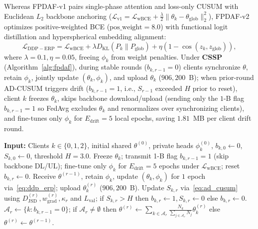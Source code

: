 \documentclass{llncs}
\begin{document}
Whereas FPDAF-v1 pairs single-phase attention and loss-only CUSUM with Euclidean $L_2$ backbone anchoring ($\mathcal{L}_{\mathrm{v1}} = \mathcal{L}_{\mathrm{wBCE}} + \frac{\lambda}{2}\|\theta_k-\theta_{\mathrm{glob}}\|_2^2$), FPDAF-v2 optimizes positive-weighted BCE ($\mathrm{pos\_weight}=8.0$) with functional logit distillation and hyperspherical embedding alignment:
\begin{equation}\label{eq:ddp_erp}
\mathcal{L}_{\mathrm{DDP-ERP}}
=\mathcal{L}_{\mathrm{wBCE}}
+\lambda D_{\mathrm{KL}}(P_k\|P_{\mathrm{glob}})
+\eta\left(1-\cos(z_k,z_{\mathrm{glob}})\right),
\end{equation}
where $\lambda=0.1, \eta=0.05$, freeing $\phi_k$ from weight penalties. Under \textbf{CSSP} (Algorithm~\ref{alg:fpdaf}), during stable rounds ($b_{k,r-1}=0$) clients synchronize $\theta$, retain $\phi_k$, jointly update $(\theta_k,\phi_k)$, and upload $\theta_k$ ($906{,}200$~B); when prior-round AD-CUSUM triggers drift ($b_{k,r-1}=1$, i.e., $S_{r-1}$ exceeded $H$ prior to reset), client $k$ freezes $\theta_k$, skips backbone download/upload (sending only the $1$-B flag $b_{k,r-1}=1$ so FedAvg excludes $\theta_k$ and renormalizes over synchronizing clients), and fine-tunes only $\phi_k$ for $E_{\mathrm{drift}}=5$ local epochs, saving $1.81$~MB per client drift round.

\begin{algorithm}[t]
\caption{FPDAF-v2 Training, AD-CUSUM Monitoring, and CSSP Adaptation}
\label{alg:fpdaf}
\begin{algorithmic}[1]
\scriptsize
\STATE \textbf{Input:} Clients $k \in \{0,1,2\}$, initial shared $\theta^{(0)}$, private heads $\phi_k^{(0)}$, $b_{k,0}\leftarrow 0$, $S_{k,0}\leftarrow 0$, threshold $H=3.0$.
      \STATE Freeze $\theta_k$; transmit 1-B flag $b_{k,r-1}=1$ (skip backbone DL/UL); fine-tune only $\phi_k$ for $E_{\mathrm{drift}}=5$ epochs under $\mathcal{L}_{\mathrm{wBCE}}$; reset $b_{k,r}\leftarrow 0$.
    \ELSE
      \STATE Receive $\theta^{(r-1)}$, retain $\phi_k$, update $(\theta_k,\phi_k)$ for $1$ epoch via~\eqref{eq:ddp_erp}; upload $\theta_k^{(r)}$ ($906{,}200$~B).
      \STATE Update $S_{k,r}$ via~\eqref{eq:ad_cusum} using $D_{\mathrm{JSD}}^{(r)}, w_{\mathrm{grad}}^{(r)}, \kappa_r$ and $L_{\mathrm{val}}$; if $S_{k,r} > H$ then $b_{k,r}\leftarrow 1, S_{k,r} \leftarrow 0$ else $b_{k,r}\leftarrow 0$.
    \ENDIF
  \ENDFOR
  \STATE $\mathcal{A}_r \leftarrow \{k : b_{k,r-1}=0\}$; if $\mathcal{A}_r \neq \emptyset$ then $\theta^{(r)} \leftarrow \sum_{k\in\mathcal{A}_r}\frac{N_k}{\sum_{j\in\mathcal{A}_r} N_j}\theta_k^{(r)}$ else $\theta^{(r)} \leftarrow \theta^{(r-1)}$.
\ENDFOR
\end{algorithmic}
\end{algorithm}
\end{document}
